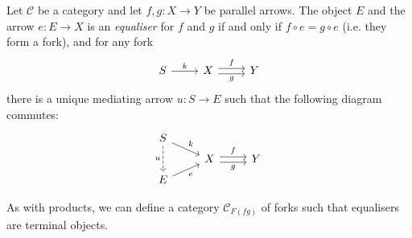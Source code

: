 \documentclass[article, a4paper, 11pt, oneside]{memoir}
\numberwithin{equation}{chapter}
\newcommand{\cat}[1]{\mathcal{#1}}
\newcommand{\catC}{\cat{C}}
\begin{document}
\begin{definition}[Equalisers]
    Let $\catC$ be a category and let $f,g \colon X \to Y$ be parallel arrows. The object $E$ and the arrow $e \colon E \to X$ is an \emph{equaliser} for $f$ and $g$ if and only if $f \circ e = g \circ e$ (i.e. they form a fork), and for any fork
    \begin{equation*}
        \begin{tikzcd}
            S
                \ar[r, "k"]
            & X
                \ar[r, "f", shift left]
                \ar[r, "g", shift right, swap]
            & Y
        \end{tikzcd}
    \end{equation*}
    there is a unique mediating arrow $u \colon S \to E$ such that the following diagram commutes:
    \begin{equation*}
        \begin{tikzcd}[row sep=tiny]
            S
                \ar[dr, "k"]
                \ar[dd, "u", swap, dashed]
            \\
            & X
                \ar[r, "f", shift left]
                \ar[r, "g", shift right, swap]
            & Y
            \\
            E
                \ar[ur, "e", swap]
        \end{tikzcd}
    \end{equation*}
\end{definition}
%
As with products, we can define a category $\catC_{F(fg)}$ of forks such that equalisers are terminal objects. 
\end{document}
